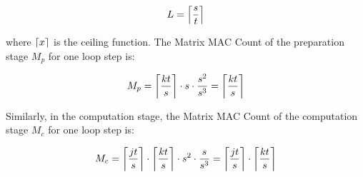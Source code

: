 \begin{equation}
    \label{eq:gen_1}
    \begin{aligned}
    L = \ceil*{\frac{s}{t}}
    \end{aligned}
    \end{equation}



where $\ceil*{x}$ is the ceiling function. The Matrix MAC Count of the preparation stage $M_{p}$ for one loop step is:

\begin{equation}
    \label{eq:gen_3}
    \begin{aligned}
    M_{p} = \ceil*{\frac{kt}{s}} \cdot s \cdot \frac{s^2}{s^3} = \ceil*{\frac{kt}{s}}
    \end{aligned}
    \end{equation}

Similarly, in the computation stage, the Matrix MAC Count of the computation stage $M_c$ for one loop step is:




\begin{equation}
    \label{eq:gen_5}
    \begin{aligned}
    M_c = \ceil*{\frac{jt}{s}} \cdot \ceil*{\frac{kt}{s}} \cdot s^2 \cdot \frac{s}{s^3} = \ceil*{\frac{jt}{s}} \cdot \ceil*{\frac{kt}{s}}
    \end{aligned}
    \end{equation}

